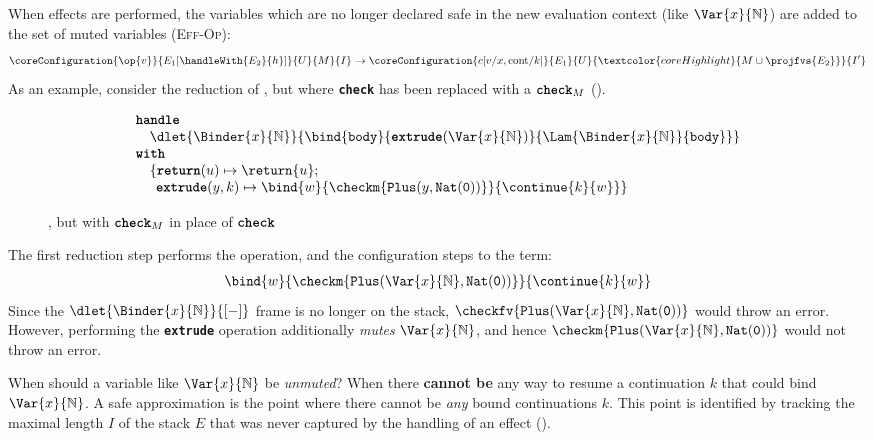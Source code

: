 When effects are performed, the variables which are no longer declared safe in the new evaluation context (like $\Var{x}{\mathbb{N}}$) are added to the set of muted variables (\textsc{Eff-Op}):
\[\coreConfiguration{\op{v}}{E_1[\handleWith{E_2}{h}]}{U}{M}{I} \to \coreConfiguration{c[v/x, \text{cont}/ k]}{E_1}{U}{\textcolor{coreHighlight}{M \cup \projfvs{E_2}}}{I'}\]
As an example, consider the reduction of , but where \textbf{\texttt{check}} has been replaced with a $\textbf{\texttt{check}}_M$ ().
\begin{figure}[H]
\[\begin{array}{l}
  \textbf{\texttt{handle}} \\
  \quad {\dlet{\Binder{x}{\mathbb{N}}}{
  \bind{\texttt{body}}{\textbf{\texttt{extrude}}(\Var{x}{\mathbb{N}})}{\Lam{\Binder{x}{\mathbb{N}}}{\texttt{body}}}}} \\ 
  \textbf{\texttt{with}} \\ 
  \quad \{ \textbf{\texttt{return}}(u) \mapsto {\return{u}}; \\ 
      \quad\;\, \textbf{\texttt{extrude}}(y, k) \mapsto {\bind{w}{\checkm{\texttt{Plus}(y, \texttt{Nat}(\texttt{0}))}}{\continue{k}{w}}}\}
\end{array}\]
\caption{, but with $\textbf{\texttt{check}}_M$ in place of $\textbf{\texttt{check}}$}
\label{fig:core-eager-looks-unsafe-M}
\end{figure}
The first reduction step performs the operation, and the configuration steps to the term:
\[\begin{array}{l}
  \bind{w}{\checkm{\texttt{Plus}(\Var{x}{\mathbb{N}}, \texttt{Nat}(\texttt{0}))}}{\continue{k}{w}}
\end{array}\]
Since the $\dlet{\Binder{x}{\mathbb{N}}}{[-]}$ frame is no longer on the stack, $\checkfv{\texttt{Plus}(\Var{x}{\mathbb{N}}, \texttt{Nat}(\texttt{0}))}$ would throw an error. However, performing the \textbf{\texttt{extrude}} operation additionally \textit{mutes} $\Var{x}{\mathbb{N}}$, and hence $\checkm{\texttt{Plus}(\Var{x}{\mathbb{N}}, \texttt{Nat}(\texttt{0}))}$  would not throw an error. 

When should a variable like $\Var{x}{\mathbb{N}}$ be \textit{unmuted}? When there \textbf{cannot be} any way to resume a continuation $k$ that could bind $\Var{x}{\mathbb{N}}$. A safe approximation is the point where there cannot be \textit{any} bound continuations $k$. This point is identified by tracking the maximal length $I$ of the stack $E$ that was never captured by the handling of an effect (). 

